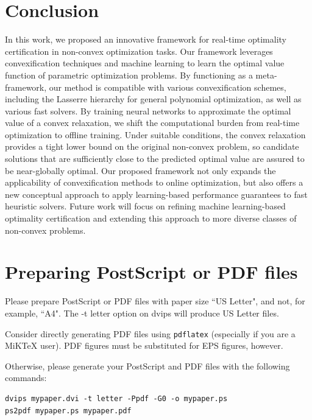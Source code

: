 \documentclass[10pt]{article} %
\theoremstyle{plain}
\theoremstyle{definition}
\theoremstyle{remark}
\begin{document}
\section{Conclusion} \label{sec:conclusion}
In this work, we proposed an innovative framework for real-time optimality certification in non-convex optimization tasks.
Our framework leverages convexification techniques and machine learning to learn the optimal value function of parametric optimization problems.
{By functioning as a meta-framework, our method is compatible with various convexification schemes, including the Lasserre hierarchy for general polynomial optimization, as well as various fast solvers.} By training neural networks to approximate the optimal value of a convex relaxation, we shift the computational burden from real-time optimization to offline training. Under suitable conditions, the convex relaxation provides a tight lower bound on the original non-convex problem, so candidate solutions that are sufficiently close to the predicted optimal value are assured to be near-globally optimal.
Our proposed framework not only expands the applicability of convexification methods to online optimization, but also offers a new conceptual approach to apply learning-based performance guarantees to fast heuristic solvers.
Future work will focus on refining machine learning-based optimality certification and extending this approach to more diverse classes of non-convex problems.






\section{Preparing PostScript or PDF files}

Please prepare PostScript or PDF files with paper size ``US Letter", and
not, for example, ``A4". The -t
letter option on dvips will produce US Letter files.

Consider directly generating PDF files using \verb+pdflatex+
(especially if you are a MiKTeX user).
PDF figures must be substituted for EPS figures, however.

Otherwise, please generate your PostScript and PDF files with the following commands:
\begin{verbatim}
dvips mypaper.dvi -t letter -Ppdf -G0 -o mypaper.ps
ps2pdf mypaper.ps mypaper.pdf
\end{verbatim}
\end{document}
